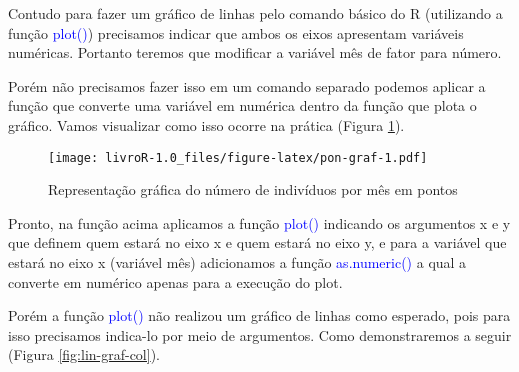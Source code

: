 \documentclass[titlepage, oneside, openany, a4paper]{book}
\newenvironment{Shaded}{\begin{snugshade}}{\end{snugshade}}
\newcommand{\DataTypeTok}[1]{\textcolor[rgb]{0.13,0.29,0.53}{#1}}
\newcommand{\KeywordTok}[1]{\textcolor[rgb]{0.13,0.29,0.53}{\textbf{#1}}}
\newcommand{\NormalTok}[1]{#1}
\newcommand{\OperatorTok}[1]{\textcolor[rgb]{0.81,0.36,0.00}{\textbf{#1}}}
\newcommand{\StringTok}[1]{\textcolor[rgb]{0.31,0.60,0.02}{#1}}
\begin{document}
Contudo para fazer um gráfico de linhas pelo comando básico do R (utilizando a função \textcolor{blue}{plot()}) precisamos indicar que ambos os eixos apresentam variáveis numéricas. Portanto teremos que modificar a variável mês de fator para número.

Porém não precisamos fazer isso em um comando separado podemos aplicar a função que converte uma variável em numérica dentro da função que plota o gráfico. Vamos visualizar como isso ocorre na prática (Figura \ref{fig:pon-graf}).

\begin{Shaded}
\end{Shaded}

\begin{figure}
\centering
\texttt{[image: livroR-1.0\_files/figure-latex/pon-graf-1.pdf]}
\caption{\label{fig:pon-graf}Representação gráfica do número de indivíduos por mês em pontos}
\end{figure}

Pronto, na função acima aplicamos a função \textcolor{blue}{plot()} indicando os argumentos x e y que definem quem estará no eixo x e quem estará no eixo y, e para a variável que estará no eixo x (variável mês) adicionamos a função \textcolor{blue}{as.numeric()} a qual a converte em numérico apenas para a execução do plot.

Porém a função \textcolor{blue}{plot()} não realizou um gráfico de linhas como esperado, pois para isso precisamos indica-lo por meio de argumentos. Como demonstraremos a seguir (Figura \ref{fig:lin-graf-col}).

\begin{Shaded}
\end{Shaded}
\end{document}
